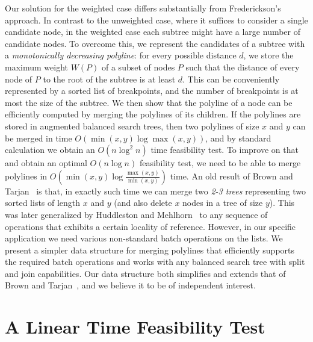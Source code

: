 \documentclass[11pt,a4paper]{article}
\newcommand{\Oh}{{O}}
\theoremstyle{definition}
\theoremstyle{remark}
\begin{document}
\vspace{0.04in} 
Our solution for the weighted case differs substantially from Frederickson's approach.
In contrast to the unweighted case, where it suffices to consider a single candidate node, in the weighted case each subtree might have a large number of candidate nodes. 
  To overcome this, we represent the candidates of a subtree with a {\em monotonically decreasing polyline}:
for every possible distance $d$, we store the maximum weight $W(P)$ of a subset of nodes $P$ such that the distance of every node of $P$ to the root of the subtree is at least $d$.
This can be conveniently represented by a sorted list of breakpoints, and the number of breakpoints is at most
the size of the subtree. We then show that the polyline of a node can be efficiently computed by merging the polylines of its children. If the polylines
are stored in augmented balanced search trees, then two polylines of size $x$ and $y$ can be merged in time $\Oh(\min(x,y)\log\max(x,y))$,
and by standard calculation we obtain an $\Oh(n\log^{2}n)$ time feasibility test. To improve on that and obtain an optimal $\Oh(n\log n)$ feasibility test,
we need to be able to merge polylines in $\Oh(\min(x,y)\log\frac{\max(x,y)}{\min(x,y)})$ time. 
An old result of Brown and Tarjan~\cite{Brown1980} is that, in exactly such time we can merge two {\em 2-3 trees} representing two sorted lists of length $x$ and $y$ (and also delete $x$ nodes in a tree of size $y$). This was later generalized by Huddleston and
Mehlhorn~\cite{huddlestonM82} to any sequence of operations that exhibits a certain locality of reference. However, in our specific
application we need various non-standard batch operations on the lists.
We present a simpler data structure for merging polylines that efficiently supports the required batch operations and works with %
any balanced search tree with split and join capabilities. Our data structure both simplifies and extends that of Brown and Tarjan~\cite{Brown1980}, and we believe it to be of independent interest. 


\section{A Linear Time Feasibility Test}
\label{linear F.T.}
\end{document}
